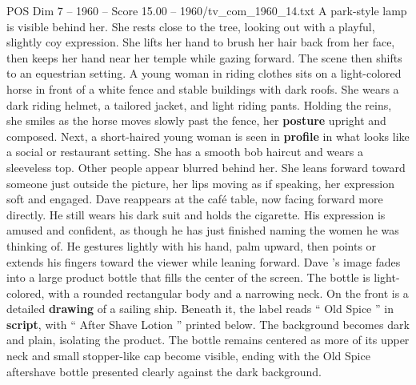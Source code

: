 \begin{textsample}{POS Dim 7 – 1960 – Score 15.00 – 1960/tv\_com\_1960\_14.txt}
A park-style lamp is visible behind her.
She rests close to the tree, looking out with a playful, slightly coy expression.
She lifts her hand to brush her hair back from her face, then keeps her hand near her temple while gazing forward.
The scene then shifts to an equestrian setting.
A young woman in riding clothes sits on a light-colored horse in front of a white fence and stable buildings with dark roofs.
She wears a dark riding helmet, a tailored jacket, and light riding pants.
Holding the reins, she smiles as the horse moves slowly past the fence, her \textbf{posture} upright and composed.
Next, a short-haired young woman is seen in \textbf{profile} in what looks like a social or restaurant setting.
She has a smooth bob haircut and wears a sleeveless top.
Other people appear blurred behind her.
She leans forward toward someone just outside the picture, her lips moving as if speaking, her expression soft and engaged.
Dave reappears at the café table, now facing forward more directly.
He still wears his dark suit and holds the cigarette.
His expression is amused and confident, as though he has just finished naming the women he was thinking of.
He gestures lightly with his hand, palm upward, then points or extends his fingers toward the viewer while leaning forward.
Dave ’s image fades into a large product bottle that fills the center of the screen.
The bottle is light-colored, with a rounded rectangular body and a narrowing neck.
On the front is a detailed \textbf{drawing} of a sailing ship.
Beneath it, the label reads “ Old Spice ” in \textbf{script}, with “ After Shave Lotion ” printed below.
The background becomes dark and plain, isolating the product.
The bottle remains centered as more of its upper neck and small stopper-like cap become visible, ending with the Old Spice aftershave bottle presented clearly against the dark background.

\end{textsample}
